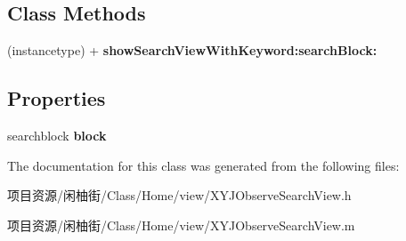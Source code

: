 \subsection*{Class Methods}
\begin{DoxyCompactItemize}
\item 
\mbox{\label{interface_x_y_j_observe_search_view_aed43abeac5873d9ca61ed8ffee89fe00}} 
(instancetype) + {\bfseries show\+Search\+View\+With\+Keyword\+:search\+Block\+:}
\end{DoxyCompactItemize}
\subsection*{Properties}
\begin{DoxyCompactItemize}
\item 
\mbox{\label{interface_x_y_j_observe_search_view_afb3fe1371b9c690ae20bf9016f6b5e58}} 
searchblock {\bfseries block}
\end{DoxyCompactItemize}


The documentation for this class was generated from the following files\+:\begin{DoxyCompactItemize}
\item 
项目资源/闲柚街/\+Class/\+Home/view/X\+Y\+J\+Observe\+Search\+View.\+h\item 
项目资源/闲柚街/\+Class/\+Home/view/X\+Y\+J\+Observe\+Search\+View.\+m\end{DoxyCompactItemize}
